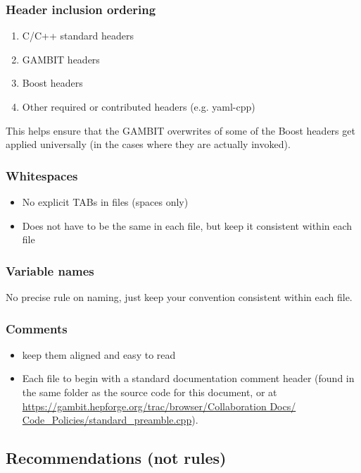 \subsubsection{Header inclusion ordering} 
\begin{enumerate}
  \item C/C++ standard headers
  \item GAMBIT headers
  \item Boost headers
  \item Other required or contributed headers (e.g. yaml-cpp)
\end{enumerate}
This helps ensure that the GAMBIT overwrites of some of the Boost headers get applied universally (in the cases where they are actually invoked).

\subsubsection{Whitespaces} 
\begin{itemize} 
  \item No explicit TABs in files (spaces only)
  \item Does not have to be the same in each file, but keep it consistent within each file
\end{itemize}

\subsubsection{Variable names} No precise rule on naming, just keep your convention consistent within each file.

\subsubsection{Comments}
\label{comments} 
\begin{itemize} 
  \item keep them aligned and easy to read
  \item Each file to begin with a standard documentation comment header (found in the same folder as the source code for this document, or at \href{https://gambit.hepforge.org/trac/browser/Collaboration\%20Docs/Code\_Policies/standard_preamble.cpp}{https://gambit.hepforge.org/trac/browser/Collaboration Docs/\\Code\_Policies/standard\_preamble.cpp}).
\end{itemize} 


\subsection{Recommendations (not rules)}

